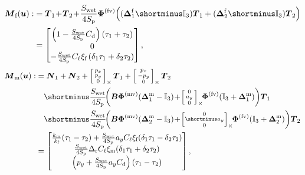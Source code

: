 \begin{align}
\label{eq:Mf}
    \boldsymbol{M}_{\text{f}}(\boldsymbol{u}) :&=  \boldsymbol{T}_{1} \!+\! \boldsymbol{T}_{2} \!+\! \frac{S_{\text{wet}}}{4S_{\text{p}}} \boldsymbol{\Phi}^{\text{(fv)}} \Big( (\boldsymbol{\Delta}^{\text{f}}_1 \shortminus \mathbb{I}_{3} ) \boldsymbol{T}_{1} + ( \boldsymbol{\Delta}^{\text{f}}_2 \shortminus \mathbb{I}_{3}) \boldsymbol{T}_{2}\Big) \nonumber\\
     &=\begin{bmatrix} \left(1-\frac{S_{\text{wet}}}{4S_{\text{p}}} C_{\text{d}}\right) (\tau_{1} + \tau_{2}) \\  0  \\ -\frac{S_{\text{wet}}}{4S_{\text{p}}}C_{\ell}\xi_{\text{f}} \left(\delta_{1}\tau_{1} + \delta_{2}\tau_{2}\right) \end{bmatrix},
\end{align}
\begin{align}
\nonumber
 \boldsymbol{M}_{\text{m}}(\boldsymbol{u}) :&= \boldsymbol{N}_{1} + \boldsymbol{N}_{2} + \skewsym{\smallm{p_x\\ p_y\\ 0}} \boldsymbol{T}_{1} + \skewsym{\smallm{p_x\\ -p_y\\ 0}} \boldsymbol{T}_{2}\\
 \nonumber
   &\quad \shortminus \frac{S_{\text{wet}}}{4S_{\text{p}}}\! \bigg( \boldsymbol{B} \boldsymbol{\Phi}^{\text{(mv)}} (\boldsymbol{\Delta}^{\text{m}}_1- \mathbb{I}_{3} ) \! + \! \skewsym{\smallm{0 \\ a_y \\ 0}} \!\! \boldsymbol{\Phi}^{\text{(fv)}} (\mathbb{I}_{3} + \boldsymbol{\Delta}^{\text{m}}_1 ) \bigg) \boldsymbol{T}_{1} \\
   \nonumber
   &\quad \shortminus \frac{S_{\text{wet}}}{4S_{\text{p}}} \!\bigg( \boldsymbol{B} \boldsymbol{\Phi}^{\text{(mv)}} (\boldsymbol{\Delta}^{\text{m}}_2 - \mathbb{I}_{3} ) \! + \! \skewsym{\smallm{0 \\ \!\shortminus a_y \!\\ 0}} \!\! \boldsymbol{\Phi}^{\text{(fv)}} (\mathbb{I}_{3} + \boldsymbol{\Delta}^{\text{m}}_2 ) \bigg) \boldsymbol{T}_{2} \\
   \label{eq:Mm}
    &=\begin{bmatrix} \frac{k_{\text{m}} }{k_{\text{f}}}(\tau_{1} - \tau_{2}) + \frac{S_{\text{wet}}}{4S_{\text{p}}}a_{y}C_{\ell}\xi_{\text{f}}(\delta_{1}\tau_{1} - \delta_{2}\tau_{2}) \\
   \frac{S_{\text{wet}}}{4S_{\text{p}}} \Delta_{\text{r}}C_{\ell}\xi_{\text{m}}(\delta_{1}\tau_{1} + \delta_{2}\tau_{2}) \\
   \left(p_{y}+\frac{S_{\text{wet}}}{4S_{\text{p}}} a_{y} C_{\text{d}}\right)(\tau_{1} - \tau_{2})
   \end{bmatrix},
\end{align}
